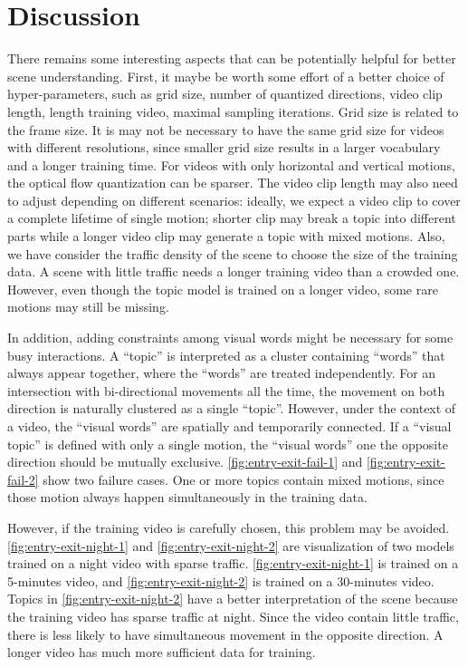 \section{Discussion}

There remains some interesting aspects that can be potentially helpful for better scene understanding.
First, it maybe be worth some effort of a better choice of hyper-parameters, such as grid size, number of quantized directions, video clip length, length training video, maximal sampling iterations.
Grid size is related to the frame size. It is may not be necessary to have the same grid size for videos with different resolutions, since smaller grid size results in a larger vocabulary and a longer training time.
For videos with only horizontal and vertical motions, the optical flow quantization can be sparser. 
The video clip length may also need to adjust depending on different scenarios: ideally, we expect a video clip to cover a complete lifetime of single motion; shorter clip may break a topic into different parts while a longer video clip may generate a topic with mixed motions. 
Also, we have consider the traffic density of the scene to choose the size of the training data.
A scene with little traffic needs a longer training video than a crowded one.
However, even though the topic model is trained on a longer video, some rare motions may still be missing.


In addition, adding constraints among visual words might be necessary for some busy interactions. 
A ``topic'' is interpreted as a cluster containing ``words'' that always appear together, where the ``words'' are treated independently.
For an intersection with bi-directional movements all the time, the movement on both direction is naturally clustered as a single ``topic''. 
However, under the context of a video, the ``visual words'' are spatially and temporarily connected. 
If a ``visual topic'' is defined with only a single motion, the ``visual words'' one the opposite direction should be mutually exclusive.
\ref{fig:entry-exit-fail-1} and \ref{fig:entry-exit-fail-2} show two failure cases. 
One or more topics contain mixed motions, since those motion always happen simultaneously in the training data.



However, if the training video is carefully chosen, this problem may be avoided.
\ref{fig:entry-exit-night-1} and \ref{fig:entry-exit-night-2} are visualization of two models trained on a night video with sparse traffic. 
\ref{fig:entry-exit-night-1} is trained on a 5-minutes video, and \ref{fig:entry-exit-night-2} is trained on a 30-minutes video.
Topics in \ref{fig:entry-exit-night-2} have a better interpretation of the scene because the training video has sparse traffic at night. 
Since the video contain little traffic, there is less likely to have simultaneous movement in the opposite direction.
A longer video has much more sufficient data for training.


